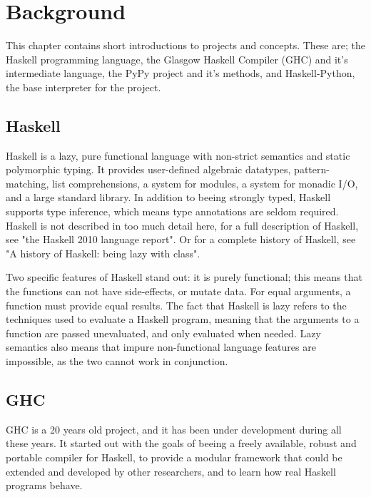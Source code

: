 
\chapter{Background}
\label{chap:back}

This chapter contains short introductions to projects and concepts. These are;
the Haskell programming language,
the Glasgow Haskell Compiler (GHC) and it's intermediate language,
the PyPy project and it's methods,
and Haskell-Python, the base interpreter for the project.

\section{Haskell}

Haskell is a lazy, pure functional language with non-strict semantics and static 
polymorphic typing. It provides user-defined algebraic datatypes, pattern-matching, 
list comprehensions, a system for modules, a system for monadic I/O, and a large 
standard library. In addition to beeing strongly typed, Haskell supports type
inference, which means type annotations are seldom required. Haskell is not described
in too much detail here, for a full description 
of Haskell, see "the Haskell 2010 language report"\cite{marlow2010haskell}. 
Or for a complete history of Haskell, see "A history of Haskell: being lazy 
with class"\cite{hudak2007history}.

Two specific features
of Haskell stand out: it is purely functional; this means that the functions 
can not have side-effects, or mutate data. For equal arguments, a function 
must provide equal results. The fact that Haskell is lazy refers to the techniques
used to evaluate a Haskell program, meaning that the arguments to a function are passed
unevaluated, and only evaluated when needed. Lazy semantics also means that impure 
non-functional language features are impossible, as the two cannot work in conjunction.
\cite{marlow2010haskell, marlow2012glasgow}

\section{GHC}

GHC is a 20 years old project, and it has been under development during
all these years. It started out with the goals of beeing a freely available,
robust and portable compiler for Haskell, to provide a modular framework that
could be extended and developed by other researchers, and to learn how real
Haskell programs behave. \cite{marlow2012glasgow}

